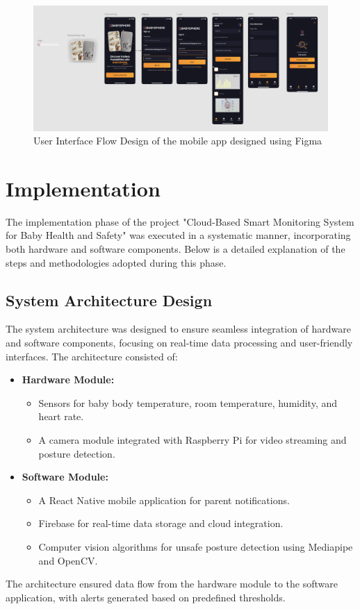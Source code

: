\documentclass[12pt,a4paper]{report}
\begin{document}
\begin{figure}[hbtp]
  \centering
  \includegraphics[scale=0.32]{./pic/uiflow.png}
  \caption{User Interface Flow Design of the mobile app designed using Figma}
  \label{fig:uiflow}
\end{figure}
\newpage
\chapter{Implementation}
The implementation phase of the project "Cloud-Based Smart Monitoring System for Baby Health and Safety" was executed in a systematic manner, incorporating both hardware and software components. Below is a detailed explanation of the steps and methodologies adopted during this phase.

\section{System Architecture Design}
The system architecture was designed to ensure seamless integration of hardware and software components, focusing on real-time data processing and user-friendly interfaces. The architecture consisted of:
\begin{itemize}
  \item \textbf{Hardware Module:}
   \begin{itemize}
    \item Sensors for baby body temperature, room temperature, humidity, and heart rate.
    \item A camera module integrated with Raspberry Pi for video streaming and posture detection.
  \end{itemize}
  \item \textbf{Software Module:}
  \begin{itemize}
    \item A React Native mobile application for parent notifications.
    \item Firebase for real-time data storage and cloud integration.
    \item Computer vision algorithms for unsafe posture detection using Mediapipe and OpenCV.
  \end{itemize}
\end{itemize}
The architecture ensured data flow from the hardware module to the software application, with alerts generated based on predefined thresholds.
\end{document}
